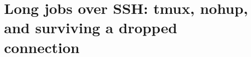 \chapter{Long jobs over SSH: tmux, nohup, and surviving a dropped connection}
\label{ch:long-jobs-over-ssh-tmux-nohup-and}

